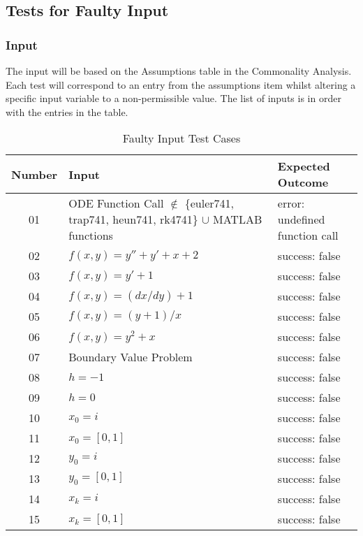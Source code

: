 \documentclass[12pt, titlepage]{article}
\begin{document}
\subsection{Tests for Faulty Input}

\subsubsection{Input}
		
The input will be based on the Assumptions table in the Commonality Analysis. Each test will correspond to an entry from the assumptions item whilst altering a specific input variable to a non-permissible value. The list of inputs is in order with the entries in the table.

\begin{table} [H]
  \caption{Faulty Input Test Cases}
  \label{Table:Table_FaultyInputs}  
\begin{tabular}{|c|p{8cm}|p{6cm}|}
  \hline	
  \textbf{Number} & \textbf{Input} &\textbf{Expected Outcome}\\
  \hline 
  01 & ODE Function Call $\mathbb{\notin}$ \{euler741, trap741, heun741, rk4741\} $\mathbb{\cup}$ 
  MATLAB functions & error: undefined function call\\ \hline
  02& $f(x, y) = y'' + y' + x + 2$ & success: false\\ \hline
  03& $f(x, y) = y' + 1$ & success: false\\ \hline
  04& $f(x, y) = (dx/dy) + 1$ & success: false\\ \hline
  05& $f(x, y) = (y + 1) / x$ & success: false\\ \hline
  06& $f(x, y) = y^2 + x$ & success: false\\ \hline
  07& Boundary Value Problem & success: false\\ \hline
  08& $h = -1$ & success: false\\ \hline
  09& $h = 0$ & success: false\\ \hline
  10& $x_0 = i$ & success: false\\ \hline 
  11& $x_0 = [0, 1]$ & success: false\\ \hline 
  12& $y_0 = i$ & success: false\\ \hline 
  13& $y_0 = [0, 1]$ & success: false\\ \hline
  14& $x_k = i$ & success: false\\ \hline 
  15& $x_k = [0, 1]$ & success: false\\ \hline

\end{tabular}\\
\end{table}
\end{document}

